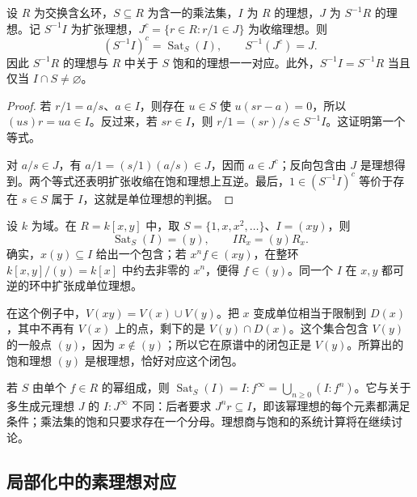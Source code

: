 \begin{proposition}\label{b3:prop:ideal-localization-saturation}
	设 \(R\) 为交换含幺环，\(S\subseteq R\) 为含一的乘法集，\(I\) 为 \(R\) 的理想，\(J\) 为 \(S^{-1}R\) 的理想。记 \(S^{-1}I\) 为扩张理想，\(J^c=\{r\in R:r/1\in J\}\) 为收缩理想。则
	\[
		(S^{-1}I)^c=\operatorname{Sat}_S(I),\qquad S^{-1}(J^c)=J.
	\]
	因此 \(S^{-1}R\) 的理想与 \(R\) 中关于 \(S\) 饱和的理想一一对应。此外，\(S^{-1}I=S^{-1}R\) 当且仅当 \(I\cap S\ne\varnothing\)。
\end{proposition}
\begin{proof}
	若 \(r/1=a/s\)、\(a\in I\)，则存在 \(u\in S\) 使 \(u(sr-a)=0\)，所以 \((us)r=ua\in I\)。反过来，若 \(sr\in I\)，则 \(r/1=(sr)/s\in S^{-1}I\)。这证明第一个等式。

	对 \(a/s\in J\)，有 \(a/1=(s/1)(a/s)\in J\)，因而 \(a\in J^c\)；反向包含由 \(J\) 是理想得到。两个等式还表明扩张收缩在饱和理想上互逆。最后，\(1\in(S^{-1}I)^c\) 等价于存在 \(s\in S\) 属于 \(I\)，这就是单位理想的判据。
\end{proof}

设 \(k\) 为域。在 \(R=k[x,y]\) 中，取 \(S=\{1,x,x^2,\ldots\}\)、\(I=(xy)\)，则
\[
	\operatorname{Sat}_S(I)=(y),\qquad I R_x=(y)R_x.
\]
确实，\(x(y)\subseteq I\) 给出一个包含；若 \(x^n f\in(xy)\)，在整环 \(k[x,y]/(y)=k[x]\) 中约去非零的 \(x^n\)，便得 \(f\in(y)\)。同一个 \(I\) 在 \(x,y\) 都可逆的环中扩张成单位理想。

\ProseParagraphBreak
在这个例子中，\(V(xy)=V(x)\cup V(y)\)。把 \(x\) 变成单位相当于限制到 \(D(x)\)，其中不再有 \(V(x)\) 上的点，剩下的是 \(V(y)\cap D(x)\)。这个集合包含 \(V(y)\) 的一般点 \((y)\)，因为 \(x\notin(y)\)；所以它在原谱中的闭包正是 \(V(y)\)。所算出的饱和理想 \((y)\) 是根理想，恰好对应这个闭包。

\ProseParagraphBreak
若 \(S\) 由单个 \(f\in R\) 的幂组成，则 \(\operatorname{Sat}_S(I)=I:f^\infty=\bigcup_{n\ge0}(I:f^n)\)。它与关于多生成元理想 \(J\) 的 \(I:J^\infty\) 不同：后者要求 \(J^n r\subseteq I\)，即该幂理想的每个元素都满足条件；乘法集的饱和只要求存在一个分母。理想商与饱和的系统计算将在继续讨论。

\subsection{局部化中的素理想对应}
\label{b3:subsec:0202:02}


